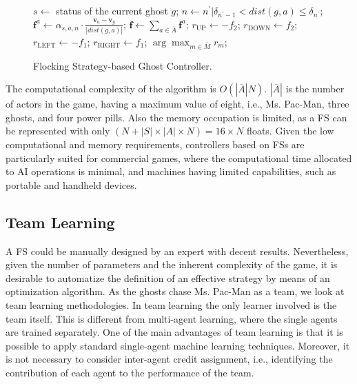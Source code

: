 \documentclass[journal]{IEEEtran}
\begin{document}
\begin{figure}[!t]
\begin{algorithmic}
\STATE $s\gets$ status of the current ghost $g$;
	\STATE $n\gets n^\prime | \delta_{n^\prime-1} < dist(g,a) \leq \delta_{n^\prime}$; 
	\STATE $\mathbf{f}^a \gets \alpha_{s,a,n} \cdot \frac{\mathbf{v}_a - \mathbf{v}_g}{|dist(g,a)|}$; 
\ENDFOR
\STATE $\mathbf{f} \gets \sum_{a \in \overline{A}} \mathbf{f}^a$; 
\STATE {}
\STATE $r_\text{UP} \gets - f_2$;
\STATE $r_\text{DOWN} \gets f_2$;
\STATE $r_\text{LEFT} \gets - f_1$;
\STATE $r_\text{RIGHT} \gets f_1$;
\RETURN $\arg\max_{m \in \overline{M}} r_m$; 
\end{algorithmic}
\caption{Flocking Strategy-based Ghost Controller.}
\label{alg:FS_Controller} 
\end{figure}

The computational complexity of the algorithm is $O(|\overline{A}|N)$. $|\overline{A}|$ is the number of actors in the game, having a maximum value of eight, i.e., Ms. Pac-Man, three ghosts, and four power pills. Also the memory occupation is limited, as a FS can be represented with only $(N + |S| \times |A| \times N) = 16 \times N$ floats. Given the low computational and memory requirements, controllers based on FSs are particularly suited for commercial games, where the computational time allocated to AI operations is minimal, and machines having limited capabilities, such as portable and handheld devices.

\subsection{Team Learning}
A FS could be manually designed by an expert with decent results. Nevertheless, given the number of parameters and the inherent complexity of the game, it is desirable to automatize the definition of an effective strategy by means of an optimization algorithm. As the ghosts chase Ms. Pac-Man as a team, we look at team learning methodologies. In team learning \cite{Panait2005} the only learner involved is the team itself. This is different from multi-agent learning, where the single agents are trained separately. One of the main advantages of team learning is that it is possible to apply standard single-agent machine learning techniques. Moreover, it is not necessary to consider inter-agent credit assignment, i.e., identifying the contribution of each agent to the performance of the team.
\end{document}
